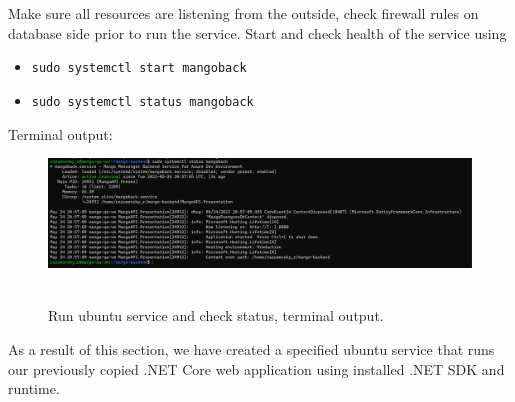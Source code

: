 Make sure all resources are listening from the outside, check firewall rules on database side prior to run the service.
Start and check health of the service using
\begin{itemize}
    \item \texttt{sudo systemctl start mangoback}
    \item \texttt{sudo systemctl status mangoback}
\end{itemize}
Terminal output:
\begin{figure}[H]
    \centering
    \includegraphics[width=1\textwidth]{img/05_ubuntu_service_status}
    ~\caption{Run ubuntu service and check status, terminal output.}\label{fig:figure14}
\end{figure}
As a result of this section, we have created a specified ubuntu service that runs our previously copied .NET Core
web application using installed .NET SDK and runtime.